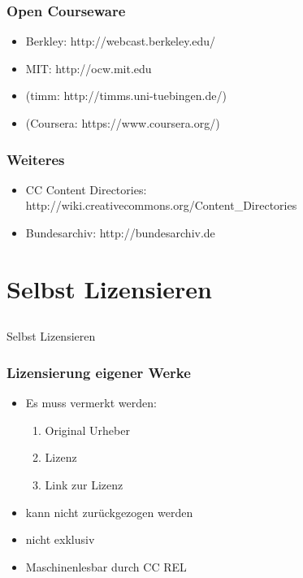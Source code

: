 \documentclass[table]{beamer}
\begin{document}
\begin{frame}
    \frametitle{Open Courseware}
      \begin{itemize}
        \item<2-> Berkley: http://webcast.berkeley.edu/
        \item<3-> MIT: http://ocw.mit.edu
        \item<4-> (timm: http://timms.uni-tuebingen.de/)
        \item<5-> (Coursera: https://www.coursera.org/)
    \end{itemize}
\end{frame}

\begin{frame}
    \frametitle{Weiteres}
      \begin{itemize}
        \item<1-> CC Content Directories: http://wiki.creativecommons.org/Content\_Directories
        \item<2-> Bundesarchiv: http://bundesarchiv.de
      \end{itemize}
\end{frame}

\section{Selbst Lizensieren}
\subsection{}

\begin{frame}
    \begin{center}\Large
    Selbst Lizensieren
    \end {center}
\end{frame}

\begin{frame}
    \frametitle{Lizensierung eigener Werke}
    \begin{itemize}
        \item<2-> Es muss vermerkt werden:
            \begin{enumerate}
                \item<3-> Original Urheber
                \item<4-> Lizenz
                \item<5-> Link zur Lizenz
            \end{enumerate}
        \item<6-> kann nicht zurückgezogen werden
        \item<7-> nicht exklusiv
        \item<8-> Maschinenlesbar durch CC REL
    \end{itemize}
\end{frame}
\end{document}
